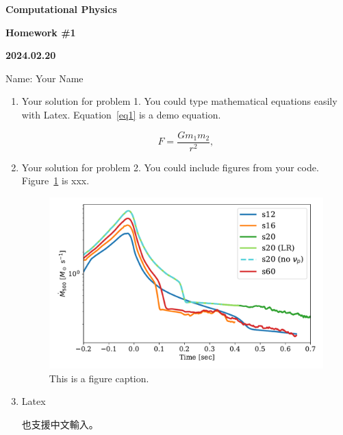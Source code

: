 \documentclass[12pt,a4paper]{article}
\newcommand{\cl}{\centerline}
\newcommand{\cntext}[1]{\begin{CJK*}{UTF8}{bkai}#1\end{CJK*}}
\begin{document}
\cl{\bf \Large Computational Physics}
\cl{\bf \large Homework \#1}
\cl{\bf \small 2024.02.20}
\cl{\small Name: Your Name}



\begin{enumerate}

\item Your solution for problem 1.  You could type mathematical equations easily with Latex. Equation~\ref{eq1} is a demo equation.

	\begin{equation} \label{eq1}
	F = \frac{G m_1 m_2}{r^2},
	\end{equation}


\item Your solution for problem 2. You could include figures from your code. Figure~\ref{fig1} is xxx.

	\begin{figure}[h] 
		\begin{center}
		\includegraphics[scale=0.6]{fig_example.pdf} 
		\caption{This is a figure caption.  \label{fig1}}
		\end{center}
	\end{figure}

\item Latex \cntext{也支援中文輸入。}
 
 
\end{enumerate}

\end{document}
